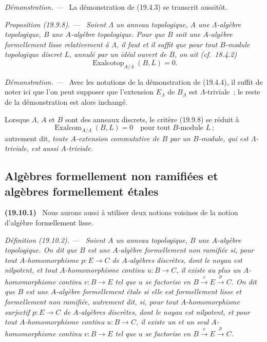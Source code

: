 \documentclass[10pt,oneside]{book}
\makeatletter
\newcommand{\setmanualcurrentlabel}[1]{\def\@currentlabel{#1}}
\newenvironment{env}[1][]{\setmanualcurrentlabel{#1}\par\medskip\noindent\textbf{(#1)}\ }{\par}
\newenvironment{definition}[1][]{%
  \setmanualcurrentlabel{#1}\par\medskip\noindent\itshape Définition (#1). ---\ }{\par}
\newenvironment{proposition}[1][]{%
  \setmanualcurrentlabel{#1}\par\medskip\noindent\itshape Proposition (#1). ---\ }{\par}
\newenvironment{proof}{%
  \par\medskip\noindent\textit{Démonstration. ---\ }}{\par}
\makeatother
\begin{document}
\begin{proof}
La démonstration de (19.4.3) se transcrit aussitôt.
\end{proof}

\begin{proposition}[19.9.8]
\label{0.19.9.8-fr}
Soient $\Lambda$ un anneau topologique, $A$ une $\Lambda$-algèbre topologique,
$B$ une $A$-algèbre topologique. Pour que $B$ soit une $A$-algèbre
formellement lisse relativement à $\Lambda$, il faut et il suffit que pour tout
$B$-module topologique discret $L$, annulé par un idéal ouvert de $B$, on ait
(cf.~18.4.2)
\[
  \operatorname{Exalcotop}_{A/\Lambda}(B,L)=0.
\]
\end{proposition}

\begin{proof}
Avec les notations de la démonstration de (19.4.4), il suffit de noter ici que
l'on peut supposer que l'extension $E_\Lambda$ de $B_\Lambda$ est
$\Lambda$-triviale~; le reste de la démonstration est alors inchangé.
\end{proof}

Lorsque $\Lambda$, $A$ et $B$ sont des anneaux discrets, le critère (19.9.8) se
réduit à
\begin{equation}
\tag{19.9.8.1}
\label{0.19.9.8.1-fr}
  \operatorname{Exalcom}_{A/\Lambda}(B,L)=0
  \quad\text{pour tout $B$-module $L$}~;
\end{equation}
autrement dit, \emph{toute $A$-extension commutative de $B$ par un $B$-module,
qui est $\Lambda$-triviale, est aussi $A$-triviale}.

\subsection{Algèbres formellement non ramifiées et algèbres formellement
étales}
\label{subsection:0.19.10-fr}
\label{0.19.10-fr}

\begin{env}[19.10.1]
\label{0.19.10.1-fr}
Nous aurons aussi à utiliser deux notions voisines de la notion d'algèbre
formellement lisse.
\end{env}

\begin{definition}[19.10.2]
\label{0.19.10.2-fr}
Soient $A$ un anneau topologique, $B$ une $A$-algèbre topologique. On dit que
$B$ est une $A$-algèbre \emph{formellement non ramifiée} si, pour tout
$A$-homomorphisme $p:E\to C$ de $A$-algèbres discrètes, dont le noyau est
nilpotent, et tout $A$-homomorphisme continu $u:B\to C$, il existe \emph{au plus
un} $A$-homomorphisme continu $v:B\to E$ tel que $u$ se factorise en
$B\xrightarrow{v}E\xrightarrow{p}C$. On dit que $B$ est une $A$-algèbre
\emph{formellement étale} si elle est formellement lisse et formellement non
ramifiée, autrement dit, si, pour tout $A$-homomorphisme surjectif $p:E\to C$
de $A$-algèbres discrètes, dont le noyau est nilpotent, et pour tout
$A$-homomorphisme continu $u:B\to C$, il existe \emph{un et un seul}
$A$-homomorphisme continu $v:B\to E$ tel que $u$ se factorise en
$B\xrightarrow{v}E\xrightarrow{p}C$.
\end{definition}
\end{document}
